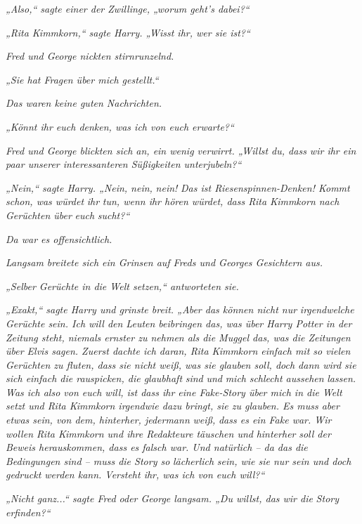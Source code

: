{\emph{„Also,“ sagte einer der Zwillinge, „worum geht's dabei?“}

\emph{„Rita Kimmkorn,“ sagte Harry. „Wisst ihr, wer sie ist?“}

\emph{Fred und George nickten stirnrunzelnd.}

\emph{„Sie hat Fragen über mich gestellt.“}

\emph{Das waren keine guten Nachrichten.}

\emph{„Könnt ihr euch denken, was ich von euch erwarte?“}

\emph{Fred und George blickten sich an, ein wenig verwirrt. „Willst du, dass wir ihr ein paar unserer interessanteren Süßigkeiten unterjubeln?“}

\emph{„Nein,“ sagte Harry. „Nein, nein,} \emph{\emph{nein!}} \emph{Das ist Riesenspinnen-Denken! Kommt schon, was würdet} \emph{\emph{ihr}} \emph{tun, wenn ihr hören würdet, dass Rita Kimmkorn nach Gerüchten über} \emph{\emph{euch}} \emph{sucht?“}

\emph{Da war es offensichtlich.}

\emph{Langsam breitete sich ein Grinsen auf Freds und Georges Gesichtern aus.}

\emph{„Selber Gerüchte in die Welt setzen,“ antworteten sie.}

\emph{„\emph{Exakt,}“ sagte Harry und grinste breit. „Aber das können nicht nur} \emph{\emph{irgendwelche}} \emph{Gerüchte sein. Ich will den Leuten beibringen das, was über Harry Potter in der Zeitung steht, niemals ernster zu nehmen als die Muggel das, was die Zeitungen über Elvis sagen. Zuerst dachte ich daran, Rita Kimmkorn einfach mit so vielen Gerüchten zu fluten, dass sie nicht weiß, was sie glauben soll, doch dann wird sie sich einfach die rauspicken, die glaubhaft} \emph{sind} \emph{und} \emph{mich} \emph{schlecht aussehen} \emph{lassen. Was ich also von euch will, ist dass ihr eine Fake-Story über mich in die Welt setzt und Rita Kimmkorn irgendwie dazu bringt, sie zu glauben. Es muss aber etwas sein, von dem, hinterher, jedermann} \emph{\emph{weiß,}} \emph{dass es ein Fake war. Wir wollen Rita Kimmkorn und ihre Redakteure täuschen und} \emph{\emph{hinterher}} \emph{soll der Beweis herauskommen, dass es falsch war. Und natürlich -- da das die Bedingungen sind -- muss die Story so} \emph{\emph{lächerlich}} \emph{sein, wie sie nur sein und doch gedruckt werden kann. Versteht ihr, was ich von euch will?“}

\emph{„Nicht ganz...“ sagte Fred oder George langsam. „Du willst, das wir die} \emph{Story} \emph{\emph{erfinden?}“}

}
